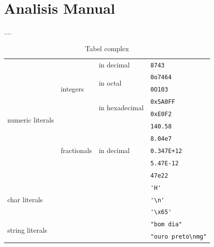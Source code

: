 \section{Analisis Manual}
....

\begin{small}
    \begin{longtable}[c]{|l|l|l|l|}
		\caption{Tabel complex}\\
		\hline
        \multirow{10}{*}{numeric literals} & \multirow{5}{*}{integers} & in decimal & \verb|8743| \\ \cline{3-4}
        & & \multirow{2}{*}{in octal} & \verb|0o7464| \\ \cline{4-4}
        & & & \verb|0O103| \\ \cline{3-4}
        & & \multirow{2}{*}{in hexadecimal} & \verb|0x5A0FF| \\ \cline{4-4}
        & & & \verb|0xE0F2| \\ \cline{2-4}
        & \multirow{5}{*}{fractionals} & \multirow{5}{*}{in decimal} & \verb|140.58| \\ \cline{4-4}
        & & & \verb|8.04e7| \\ \cline{4-4}
        & & & \verb|0.347E+12| \\ \cline{4-4}
        & & & \verb|5.47E-12| \\ \cline{4-4}
        & & & \verb|47e22| \\ \cline{1-4}
        \multicolumn{3}{|l|}{\multirow{3}{*}{char literals}} & \verb|'H'| \\ \cline{4-4}
        \multicolumn{3}{|l|}{} & \verb|'\n'| \\ \cline{4-4}          %
        \multicolumn{3}{|l|}{} & \verb|'\x65'| \\ \cline{1-4}        %
        \multicolumn{3}{|l|}{\multirow{2}{*}{string literals}} & \verb|"bom dia"| \\ \cline{4-4}
        \multicolumn{3}{|l|}{} & \verb|"ouro preto\nmg"| \\ \cline{1-4}          %
	\end{longtable}
\end{small}
